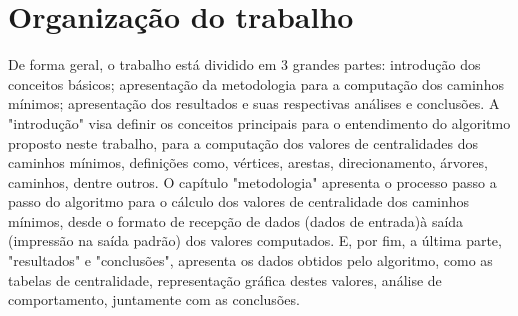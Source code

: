 \section{Organização do trabalho}
De forma geral, o trabalho está dividido em 3 grandes partes: introdução dos conceitos básicos; apresentação da metodologia para a computação dos caminhos mínimos; apresentação dos resultados e suas respectivas análises e conclusões. A "introdução" visa definir os conceitos principais para o entendimento do algoritmo proposto neste trabalho, para a computação dos valores de centralidades dos caminhos mínimos, definições como, vértices, arestas, direcionamento, árvores, caminhos, dentre outros. O capítulo "metodologia" apresenta o processo passo a passo do algoritmo para o cálculo dos valores de centralidade dos caminhos mínimos, desde o formato de recepção de dados (dados de entrada)à saída (impressão na saída padrão) dos valores computados. E, por fim, a última parte, "resultados" e "conclusões", apresenta os dados obtidos pelo algoritmo, como as tabelas de centralidade, representação gráfica destes valores, análise de comportamento, juntamente com as conclusões.

